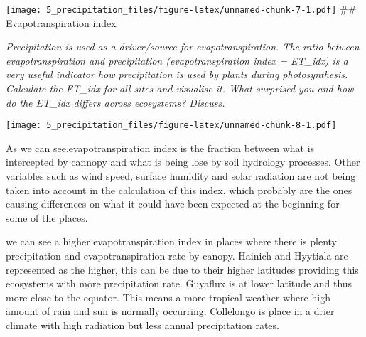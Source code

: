 \documentclass[
]{article}
\newenvironment{Shaded}{\begin{snugshade}}{\end{snugshade}}
\newcommand{\AttributeTok}[1]{\textcolor[rgb]{0.77,0.63,0.00}{#1}}
\newcommand{\FunctionTok}[1]{\textcolor[rgb]{0.00,0.00,0.00}{#1}}
\newcommand{\NormalTok}[1]{#1}
\newcommand{\OtherTok}[1]{\textcolor[rgb]{0.56,0.35,0.01}{#1}}
\newcommand{\SpecialCharTok}[1]{\textcolor[rgb]{0.00,0.00,0.00}{#1}}
\newcommand{\StringTok}[1]{\textcolor[rgb]{0.31,0.60,0.02}{#1}}
\begin{document}
\texttt{[image: 5\_precipitation\_files/figure-latex/unnamed-chunk-7-1.pdf]}
\#\# Evapotranspiration index

\emph{Precipitation is used as a driver/source for evapotranspiration.
The ratio between evapotranspiration and precipitation
(evapotranspiration index = ET\_idx) is a very useful indicator how
precipitation is used by plants during photosynthesis. Calculate the
ET\_idx for all sites and visualise it. What surprised you and how do
the ET\_idx differs across ecosystems? Discuss.}

\begin{Shaded}
\end{Shaded}

\texttt{[image: 5\_precipitation\_files/figure-latex/unnamed-chunk-8-1.pdf]}

As we can see,evapotranspiration index is the fraction between what is
intercepted by cannopy and what is being lose by soil hydrology
processes. Other variables such as wind speed, surface humidity and
solar radiation are not being taken into account in the calculation of
this index, which probably are the ones causing differences on what it
could have been expected at the beginning for some of the places.

we can see a higher evapotranspiration index in places where there is
plenty precipitation and evapotranspiration rate by canopy. Hainich and
Hyytiala are represented as the higher, this can be due to their higher
latitudes providing this ecosystems with more precipitation rate.
Guyaflux is at lower latitude and thus more close to the equator. This
means a more tropical weather where high amount of rain and sun is
normally occurring. Collelongo is place in a drier climate with high
radiation but less annual precipitation rates.
\end{document}
